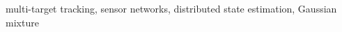 \documentclass[lettersize,journal]{IEEEtran}
\begin{document}
\begin{IEEEkeywords}
multi-target tracking, sensor networks, distributed state estimation, Gaussian mixture
\end{IEEEkeywords}

%

\maketitle



















% 
\end{document}

